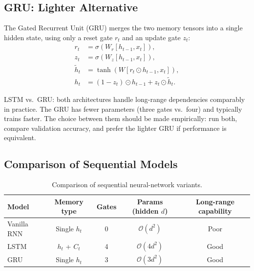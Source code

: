 \documentclass[12pt,a4paper]{article}
\begin{document}
\subsection{GRU: Lighter Alternative}

The Gated Recurrent Unit (GRU) merges the two memory tensors into a single hidden state, using only
a reset gate $r_t$ and an update gate $z_t$:
\begin{align}
  r_t &= \sigma\!\left(W_r [h_{t-1}, x_t]\right), \label{eq:gru_r}\\
  z_t &= \sigma\!\left(W_z [h_{t-1}, x_t]\right), \label{eq:gru_z}\\
  \tilde{h}_t &= \tanh\!\left(W [r_t \odot h_{t-1}, x_t]\right), \label{eq:gru_htilde}\\
  h_t &= (1 - z_t) \odot h_{t-1} + z_t \odot \tilde{h}_t. \label{eq:gru_h}
\end{align}

\begin{keyinsight}
  LSTM vs.\ GRU: both architectures handle long-range dependencies comparably in practice.
  The GRU has fewer parameters (three gates vs.\ four) and typically trains faster. The choice
  between them should be made empirically: run both, compare validation accuracy, and prefer the
  lighter GRU if performance is equivalent.
\end{keyinsight}

\subsection{Comparison of Sequential Models}

\begin{table}[htbp]
  \centering
  \caption{Comparison of sequential neural-network variants.}
  \label{tab:rnn_comparison}
  \begin{tabular}{@{}lcccc@{}}
    \toprule
    \textbf{Model} & \textbf{Memory type} & \textbf{Gates} & \textbf{Params (hidden $d$)} & \textbf{Long-range capability} \\
    \midrule
    Vanilla RNN & Single $h_t$ & 0 & $\mathcal{O}(d^2)$ & Poor \\
    LSTM        & $h_t$ + $C_t$  & 4 & $\mathcal{O}(4d^2)$ & Good \\
    GRU         & Single $h_t$ & 3 & $\mathcal{O}(3d^2)$ & Good \\
    \bottomrule
  \end{tabular}
\end{table}

\end{document}
